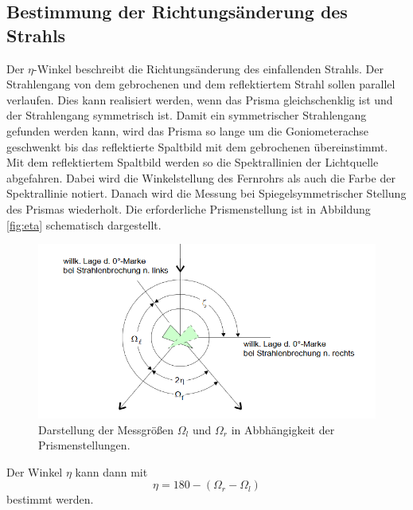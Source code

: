 \subsection{Bestimmung der Richtungsänderung des Strahls}
Der $\eta$-Winkel beschreibt die Richtungsänderung des einfallenden Strahls.
Der Strahlengang von dem gebrochenen und dem reflektiertem Strahl sollen parallel verlaufen.
Dies kann realisiert werden, wenn das Prisma gleichschenklig ist und der Strahlengang symmetrisch ist.
Damit ein symmetrischer Strahlengang gefunden werden kann, wird das Prisma so lange um die Goniometerachse geschwenkt bis das reflektierte Spaltbild mit dem gebrochenen übereinstimmt.
Mit dem reflektiertem Spaltbild werden so die Spektrallinien der Lichtquelle abgefahren.
Dabei wird die Winkelstellung des Fernrohrs als auch die Farbe der Spektrallinie notiert.
Danach wird die Messung bei Spiegelsymmetrischer Stellung des Prismas wiederholt.
Die erforderliche Prismenstellung ist in Abbildung \ref{fig:eta} schematisch dargestellt.
\begin{figure}[H]
  \centering
  \includegraphics[scale= 0.5]{content/eta.png}
  \caption{Darstellung der Messgrößen $\Omega_l$ und $\Omega_r$ in Abbhängigkeit der Prismenstellungen\cite{v402}.}
  \label{fig:spek}
\end{figure}
\noindent Der Winkel $\eta$ kann dann mit
\begin{equation}
  \label{eq:eta}
  \eta = 180 -(\Omega_r - \Omega_l)
\end{equation}
bestimmt werden.
